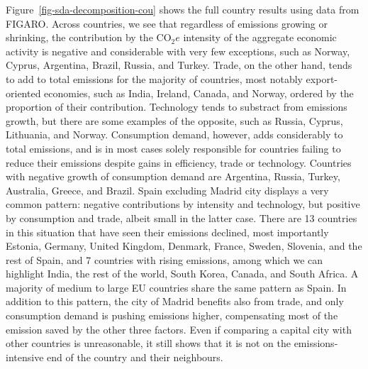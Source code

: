 \documentclass[
  10pt,
  twocolumn]{aft}
\begin{document}
Figure~\ref{fig-sda-decomposition-cou} shows the full country results
using data from FIGARO. Across countries, we see that regardless of
emissions growing or shrinking, the contribution by the \(\text{CO}_2e\)
intensity of the aggregate economic activity is negative and
considerable with very few exceptions, such as Norway, Cyprus,
Argentina, Brazil, Russia, and Turkey. Trade, on the other hand, tends
to add to total emissions for the majority of countries, most notably
export-oriented economies, such as India, Ireland, Canada, and Norway,
ordered by the proportion of their contribution. Technology tends to
substract from emissions growth, but there are some examples of the
opposite, such as Russia, Cyprus, Lithuania, and Norway. Consumption
demand, however, adds considerably to total emissions, and is in most
cases solely responsible for countries failing to reduce their emissions
despite gains in efficiency, trade or technology. Countries with
negative growth of consumption demand are Argentina, Russia, Turkey,
Australia, Greece, and Brazil. Spain excluding Madrid city displays a
very common pattern: negative contributions by intensity and technology,
but positive by consumption and trade, albeit small in the latter case.
There are 13 countries in this situation that have seen their emissions
declined, most importantly Estonia, Germany, United Kingdom, Denmark,
France, Sweden, Slovenia, and the rest of Spain, and 7 countries with
rising emissions, among which we can highlight India, the rest of the
world, South Korea, Canada, and South Africa. A majority of medium to
large EU countries share the same pattern as Spain. In addition to this
pattern, the city of Madrid benefits also from trade, and only
consumption demand is pushing emissions higher, compensating most of the
emission saved by the other three factors. Even if comparing a capital
city with other countries is unreasonable, it still shows that it is not
on the emissions-intensive end of the country and their neighbours.
\end{document}
